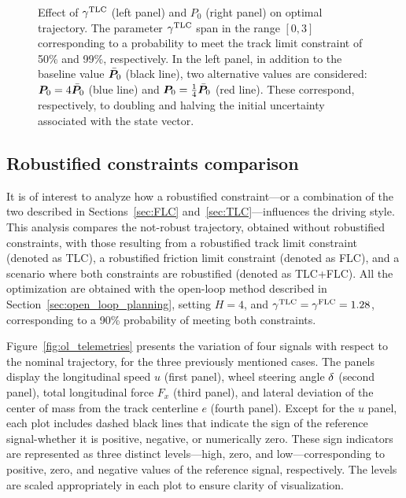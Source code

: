 \begin{figure}
	\caption{Effect of $\gamma^\textrm{TLC}$ (left panel) and $P_0$ (right panel) on optimal trajectory. The parameter $\gamma^\textrm{TLC}$ span in the range $\left[0,3\right]$ corresponding to a probability to meet the track limit constraint of 50\% and 99\%, respectively. In the left panel, in addition to the baseline value $\bar{\boldsymbol{P}}_0$ (black line), two alternative values are considered: $\boldsymbol{P}_0 = 4\bar{\boldsymbol{P}}_0$ (blue line) and $\boldsymbol{P}_0 = \frac{1}{4}\bar{\boldsymbol{P}}_0$ (red line). These correspond, respectively, to doubling and halving the initial uncertainty associated with the state vector.}
	\label{fig:ol_sensitivities}
\end{figure}

\subsection{Robustified constraints comparison}
It is of interest to analyze how a robustified constraint---or a combination of the two described in Sections~\ref{sec:FLC} and~\ref{sec:TLC}---influences the driving style. This analysis compares the not-robust trajectory, obtained without robustified constraints, with those resulting from a robustified track limit constraint (denoted as TLC), a robustified friction limit constraint (denoted as FLC), and a scenario where both constraints are robustified (denoted as TLC+FLC). All the optimization are obtained with the open-loop method described in Section~\ref{sec:open_loop_planning}, setting $H=4$, and $\gamma^\textrm{TLC}=\gamma^\textrm{FLC}=1.28$, corresponding to a 90\% probability of meeting both constraints. 

Figure~\ref{fig:ol_telemetries} presents the variation of four signals with respect to the nominal trajectory, for the three previously mentioned cases. The panels display the longitudinal speed $u$ (first panel), wheel steering angle $\delta$ (second panel), total longitudinal force $F_x$ (third panel), and lateral deviation of the center of mass from the track centerline $e$ (fourth panel). Except for the $u$ panel, each plot includes dashed black lines that indicate the sign of the reference signal-whether it is positive, negative, or numerically zero. These sign indicators are represented as three distinct levels---high, zero, and low---corresponding to positive, zero, and negative values of the reference signal, respectively. The levels are scaled appropriately in each plot to ensure clarity of visualization.

